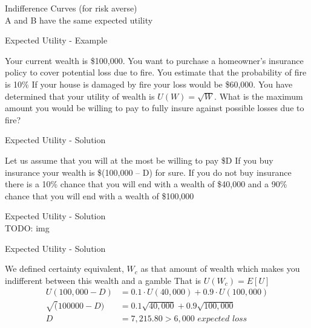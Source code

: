 \documentclass[
14pt,notheorems,hyperref={pdfauthor=whatever}
]{beamer}
\begin{document}
\begin{frame}
Indifference Curves (for risk averse)\\
\hfill \break
A and B have the same expected utility
\end{frame}

\begin{frame}
Expected Utility - Example
\hfill \break
\begin{outline}
    \1 Your current wealth is \$100,000.
    \1 You want to purchase a homeowner’s insurance policy to cover potential loss due to fire.
    \1 You estimate that the probability of fire is 10\%
    \1 If your house is damaged by fire your loss would be \$60,000. 
    \1 You have determined that your utility of wealth is $U(W) = \sqrt{W}$. 
    \1 What is the maximum amount you would be willing to pay to fully insure against possible losses due to fire?
\end{outline}
\end{frame}

\begin{frame}
Expected Utility - Solution
\hfill \break
\begin{outline}
    \1 Let us assume that you will at the most be willing to pay \$D\break
    \1 If you buy insurance your wealth is \$(100,000 – D) for sure.\break
    \1 If you do not buy insurance there is a 10\% chance that you will end with a wealth of \$40,000 and a 90\% chance that you will end with a wealth of \$100,000\break
\end{outline}
\end{frame}

\begin{frame}
Expected Utility - Solution\\
TODO: img
\end{frame}

\begin{frame}
Expected Utility - Solution
\hfill \break
\begin{outline}
    \1 We defined certainty equivalent, $W_c$  as that amount of wealth which makes you indifferent between this wealth and a gamble\break
    \1 That is $U(W_c) = E[U]$
    \begin{align*}
        U(100,000 - D) &= 0.1\cdot U(40,000) + 0.9\cdot U(100,000)\\
        \sqrt(100000-D) &= 0.1\sqrt{40,000} + 0.9\sqrt{100,000}\\
        D &= 7,215.80 > 6,000 \textit{ expected loss }\\
    \end{align*}
\end{outline}
\end{frame}
\end{document}
